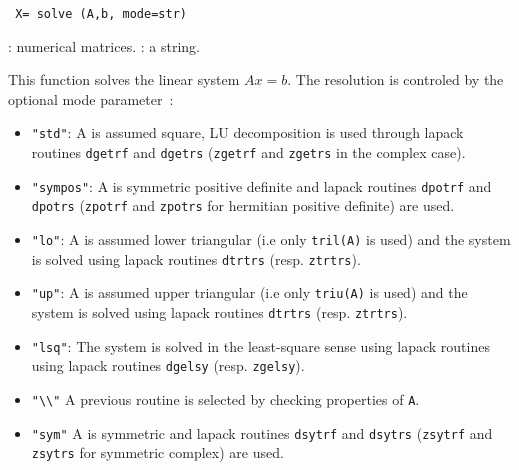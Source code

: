 
\begin{mandesc}
\end{mandesc}
\begin{calling_sequence}
\begin{verbatim}
 X= solve (A,b, mode=str)
\end{verbatim}
\end{calling_sequence}
\begin{parameters}
  \begin{varlist}
    : numerical matrices.
    : a string.
  \end{varlist}
\end{parameters}

\begin{mandescription}
This function solves the linear system $Ax = b$. The resolution is 
controled by the optional mode parameter~:
\begin{itemize}
  \item \verb+"std"+: A is assumed square, LU decomposition is used 
    through lapack routines \verb+dgetrf+ and \verb+dgetrs+ 
    (\verb+zgetrf+ and \verb+zgetrs+ in the complex case).
  \item \verb+"sympos"+: A is symmetric positive definite and lapack routines 
    \verb+dpotrf+ and \verb+dpotrs+ (\verb+zpotrf+ and \verb+zpotrs+ for hermitian positive definite) are used. 
  \item \verb+"lo"+: A is assumed lower triangular (i.e only \verb+tril(A)+ is used) and the 
    system is solved using lapack routines \verb+dtrtrs+ (resp. \verb+ztrtrs+).
  \item \verb+"up"+: A is assumed upper triangular (i.e only \verb+triu(A)+ is used) and the system is 
    solved using lapack routines \verb+dtrtrs+ (resp. \verb+ztrtrs+).
  \item \verb+"lsq"+: The system is solved in the least-square sense using 
    lapack routines using lapack routines \verb+dgelsy+ (resp. \verb+zgelsy+).
  \item \verb+"\\"+ A previous routine is selected by checking properties of \verb+A+.
  \item \verb+"sym"+ A is symmetric and lapack routines 
    \verb+dsytrf+ and \verb+dsytrs+ (\verb+zsytrf+ and \verb+zsytrs+ for symmetric complex) are used. 
\end{itemize}
\end{mandescription}

